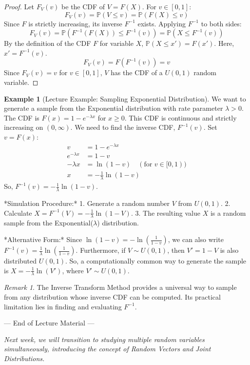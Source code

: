 \documentclass[11pt, letterpaper]{article}
\theoremstyle{plain} %
\theoremstyle{definition} %
\newtheorem{example}[theorem]{Example} %
\theoremstyle{remark} %
\newtheorem{remark}[theorem]{Remark}
\newcommand{\Prob}{\mathbb{P}} %
\begin{document}
\begin{proof}
Let $F_V(v)$ be the CDF of $V = F(X)$. For $v \in [0, 1]$:
\[
F_V(v) = \Prob(V \le v) = \Prob(F(X) \le v)
\]
Since $F$ is strictly increasing, its inverse $F^{-1}$ exists. Applying $F^{-1}$ to both sides:
\[
F_V(v) = \Prob(F^{-1}(F(X)) \le F^{-1}(v)) = \Prob(X \le F^{-1}(v))
\]
By the definition of the CDF $F$ for variable $X$, $\Prob(X \le x') = F(x')$. Here, $x' = F^{-1}(v)$.
\[
F_V(v) = F(F^{-1}(v)) = v
\]
Since $F_V(v) = v$ for $v \in [0, 1]$, $V$ has the CDF of a $U(0, 1)$ random variable.
\end{proof}

\begin{example}[Lecture Example: Sampling Exponential Distribution] \label{ex:exp_sample_impl}
We want to generate a sample from the Exponential distribution with rate parameter $\lambda > 0$.
The CDF is $F(x) = 1 - e^{-\lambda x}$ for $x \ge 0$. This CDF is continuous and strictly increasing on $(0, \infty)$.
We need to find the inverse CDF, $F^{-1}(v)$. Set $v = F(x)$:
\begin{align*} v &= 1 - e^{-\lambda x} \\ e^{-\lambda x} &= 1 - v \\ -\lambda x &= \ln(1 - v) \quad (\text{for } v \in [0, 1)) \\ x &= -\frac{1}{\lambda} \ln(1 - v) \end{align*}
So, $F^{-1}(v) = -\frac{1}{\lambda} \ln(1 - v)$.

*Simulation Procedure:*
1. Generate a random number $V$ from $U(0, 1)$.
2. Calculate $X = F^{-1}(V) = -\frac{1}{\lambda} \ln(1 - V)$.
3. The resulting value $X$ is a random sample from the Exponential($\lambda$) distribution.

*Alternative Form:* Since $\ln(1-v) = -\ln(\frac{1}{1-v})$, we can also write $F^{-1}(v) = \frac{1}{\lambda}\ln(\frac{1}{1-v})$.
Furthermore, if $V \sim U(0, 1)$, then $V' = 1 - V$ is also distributed $U(0, 1)$. So, a computationally common way to generate the sample is $X = -\frac{1}{\lambda} \ln(V')$, where $V' \sim U(0, 1)$.
\end{example}

\begin{remark}
The Inverse Transform Method provides a universal way to sample from any distribution whose inverse CDF can be computed. Its practical limitation lies in finding and evaluating $F^{-1}$.
\end{remark}

\begin{center}
--- End of Lecture Material ---
\end{center}
\textit{Next week, we will transition to studying multiple random variables simultaneously, introducing the concept of Random Vectors and Joint Distributions.}
\end{document}
